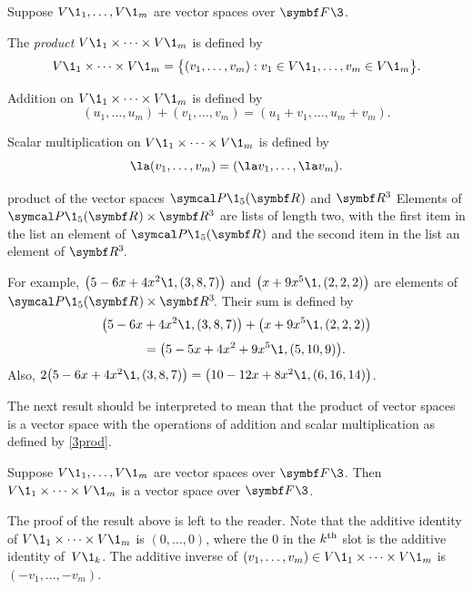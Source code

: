 {Suppose $V\1_1, \dots, V\1_m$ are vector spaces over $\F{}\3$.
\begin{Itemize}
\item
The \emph{product} $V\1_1 \times \dots \times V\1_m$ is defined by
\[
V\1_1 \times \dots \times V\1_m = \br[\big]{(v_1, \dots, v_m): v_1 \in V\1_1, \dots, v_m \in V\1_m}.
\]
\item
Addition on $V\1_1 \times \dots \times V\1_m$ is defined by
\[
(u_1, \dots, u_m) + (v_1, \dots, v_m) = (u_1 + v_1, \dots, u_m + v_m).
\]
\item
Scalar multiplication on $V\1_1 \times \dots \times V\1_m$ is defined by
\[
\la (v_1, \dots, v_m) = (\la v_1, \dots, \la v_m).
\]
\end{Itemize}}

\begin{example}{product of the vector spaces\/ $\P\1_5(\R{})$ and $\R3$}
Elements of $\P\1_5(\R{}) \times \R3$ are lists of length two, with the first item in the list an element of $\P\1_5(\R{})$ and the second item in the list an element of $\RR3$.

For example,
$\paren[\big]{ 5 - 6x + 4x^2\1, (3, 8, 7) }$ and $\paren[\big]{x + 9x^5\1, (2,2,2)}$ are elements of $\P\1_5(\R{}) \times \RR3$. Their sum is defined by
\begin{align*}
\paren[\big]{ 5 - 6x &+ 4x^2\1, (3, 8, 7) } + \paren[\big]{x + 9x^5\1, (2,2,2) } \\[3bp]
&= \paren[\big]{ 5 - 5x + 4x^2 + 9x^5\1, (5, 10,9) }.
\end{align*}
Also, $2 \paren[\big]{ 5 - 6x + 4x^2\1, (3, 8, 7) } = \paren[\big]{ 10 - 12x + 8x^2\1, (6, 16,14) }$.
\end{example}

The next result should be interpreted to mean that the product of vector spaces is a vector space with the operations of addition and scalar multiplication as defined by \ref{3prod}.

{Suppose $V\1_1, \dots, V\1_m$ are vector spaces over $\F{}\3$. Then $V\1_1 \times \dots \times V\1_m$ is a vector space over $\F{}\3$.}

The proof of the result above is left to the reader. Note that the additive identity of $V\1_1 \times \dots \times V\1_m$ is $(0, \dots, 0)$, where the $0$ in the $k^{\text{{th}}}$ slot is the additive identity of~$V\1_k$. The additive inverse of $(v_1, \dots, v_m) \in V\1_1 \times \dots \times V\1_m$ is $(-v_1, \dots, -v_m)$.

